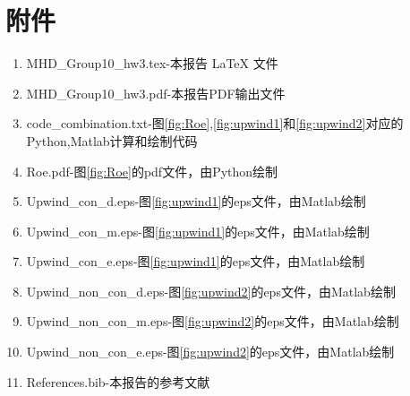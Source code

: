 \documentclass{article}
\begin{document}
\section{附件}
\begin{enumerate}
\item
MHD\_Group10\_hw3.tex-本报告 \LaTeX\xspace 文件
\item
MHD\_Group10\_hw3.pdf-本报告PDF输出文件
\item
code\_combination.txt-图\ref{fig:Roe},\ref{fig:upwind1}和\ref{fig:upwind2}对应的Python,Matlab计算和绘制代码
\item
Roe.pdf-图\ref{fig:Roe}的pdf文件，由Python绘制
\item
Upwind\_con\_d.eps-图\ref{fig:upwind1}的eps文件，由Matlab绘制
\item 
Upwind\_con\_m.eps-图\ref{fig:upwind1}的eps文件，由Matlab绘制
\item
Upwind\_con\_e.eps-图\ref{fig:upwind1}的eps文件，由Matlab绘制
\item
Upwind\_non\_con\_d.eps-图\ref{fig:upwind2}的eps文件，由Matlab绘制
\item 
Upwind\_non\_con\_m.eps-图\ref{fig:upwind2}的eps文件，由Matlab绘制
\item
Upwind\_non\_con\_e.eps-图\ref{fig:upwind2}的eps文件，由Matlab绘制
\item
References.bib-本报告的参考文献
\end{enumerate}



\end{document}
